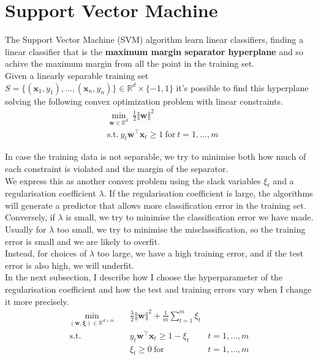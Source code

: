 \newpage
\section{Support Vector Machine}
The Support Vector Machine (SVM) algorithm learn linear classifiers, finding a linear classifier that is the \textbf{maximum margin separator hyperplane} and so achive the maximum margin from all the point in the training set.\\

Given a linearly separable training set $S = \{(\boldsymbol{x}_1, y_1), \dots, (\boldsymbol{x}_n, y_n)\} \in \mathbb{R}^d \times \{-1, 1\}$ it's possible to find this hyperplane solving the following convex optimization problem with linear constraints.\\ 
\begin{align*} 
    & \underset{\boldsymbol{w} \in \mathbb{R}^d}{\min} \ \frac{1}{2} \Vert \boldsymbol{w} \Vert^2 \\
    & \text{s.t.} \ y_t \boldsymbol{w}^\top \boldsymbol{x}_t \geq 1 \ \text{for} \ t = 1, \dots, m 
\end{align*}

In case the training data is not separable, we try to minimise both how much of each constraint is violated and the margin of the separator.\\
We express this as another convex problem using the slack variables $\xi_t$ and a regularisation coefficient $\lambda$.
If the regularisation coefficient is large, the algorithms will generate a predictor that allows more classification error in the training set.\\
Conversely, if $\lambda$ is small, we try to minimise the classification error we have made.\\
Usually for $\lambda$ too small, we try to minimise the misclassification, so the training error is small and we are likely to overfit.\\
Instead, for choices of $\lambda$ too large, we have a high training error, and if the test error is also high, we will underfit. \\In the next subsection, I describe how I choose the hyperparameter of the regularisation coefficient and how the test and training errors vary when I change it more precisely.\\ %

\begin{align*}
    \underset{(\boldsymbol{w}, \boldsymbol{\xi}) \in \mathbb{R}^{d+m}}{\min} \quad & \frac{\lambda}{2} \Vert \boldsymbol{w} \Vert^2 + \frac{1}{m} \sum_{t = 1}^m \xi_t \\
    \text{s.t.} \quad & y_t \boldsymbol{w}^\top \boldsymbol{x}_t \geq 1 - \xi_t & t = 1, \dots, m \\
    & \xi_t \geq 0 \ \text{for} & t = 1, \dots, m
\end{align*}

